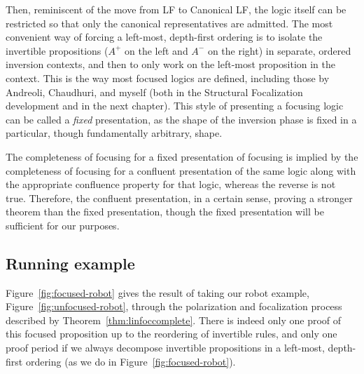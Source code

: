 Then, reminiscent of the move from LF to Canonical LF, the logic
itself can be restricted so that only the canonical representatives
are admitted. The most convenient way of forcing a left-most,
depth-first ordering is to isolate the invertible propositions ($A^+$
on the left and $A^-$ on the right) in separate, ordered inversion
contexts, and then to only work on the left-most proposition in the
context. This is the way most focused logics are defined, including
those by Andreoli, Chaudhuri, and myself (both in the Structural
Focalization development and in the next chapter). This style of 
presenting a focusing logic can be called a {\it fixed} presentation,
as the shape of the inversion phase is fixed in a particular, though
fundamentally arbitrary, shape. 

The completeness of focusing for a fixed presentation of focusing is
implied by the completeness of focusing for a confluent presentation
of the same logic along with the appropriate confluence property for
that logic, whereas the reverse is not true. Therefore, the confluent
presentation, in a certain sense, proving a stronger theorem than the
fixed presentation, though the fixed presentation will be sufficient
for our purposes.

\subsection{Running example}



Figure~\ref{fig:focused-robot} gives the result of taking our 
robot example, Figure~\ref{fig:unfocused-robot}, through the 
polarization and focalization process described by 
Theorem~\ref{thm:linfoccomplete}. There is indeed only one 
proof of this focused proposition up to the reordering of 
invertible rules, and only one proof period if we always
decompose invertible propositions in a left-most, depth-first
ordering (as we do in Figure~\ref{fig:focused-robot}). 

